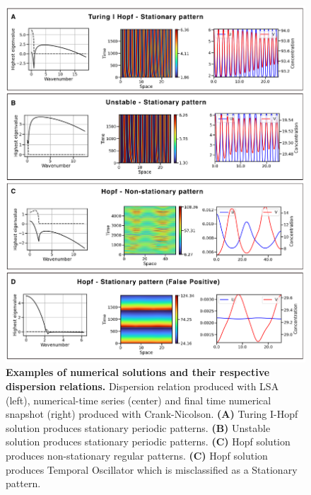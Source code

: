 \begin{figure}[H] %
    \centering
    \begin{adjustbox}{center}
        \includegraphics[width=1\textwidth]{chapters/Chapter 1/interesting_cases_nogrowth} %
    \end{adjustbox}
    \caption{\textbf{Examples of numerical solutions and their respective dispersion relations.} Dispersion relation produced with LSA (left), numerical-time series (center) and final time numerical snapshot (right) produced with Crank-Nicolson. \textbf{(A)} Turing I-Hopf solution produces stationary periodic patterns. \textbf{(B)} Unstable solution produces stationary periodic patterns. \textbf{(C)} Hopf solution produces non-stationary regular patterns. \textbf{(C)} Hopf solution produces Temporal Oscillator which is misclassified as a Stationary pattern.}
    \label{fig:interesting_cases_nogrowth} %
\end{figure}
